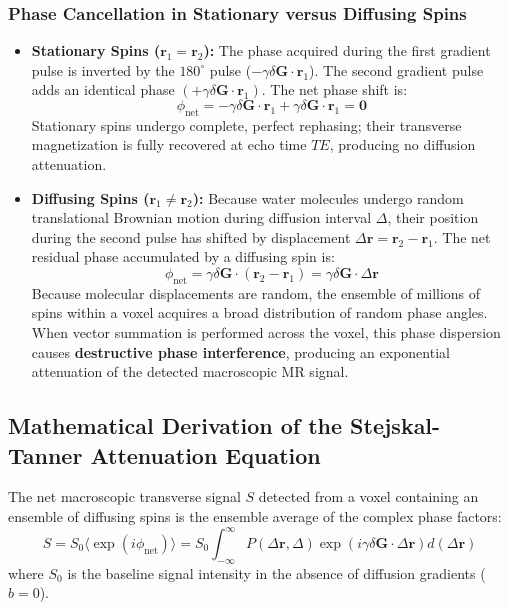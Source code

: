 \documentclass[11pt,a4paper]{article}
\begin{document}
\subsubsection{Phase Cancellation in Stationary versus Diffusing Spins}
\begin{itemize}[leftmargin=*]
    \item \textbf{Stationary Spins ($\mathbf{r}_1 = \mathbf{r}_2$):}
    The phase acquired during the first gradient pulse is inverted by the $180^\circ$ pulse ($-\gamma \delta \mathbf{G} \cdot \mathbf{r}_1$). The second gradient pulse adds an identical phase $(+\gamma \delta \mathbf{G} \cdot \mathbf{r}_1)$. The net phase shift is:
    \begin{equation}
        \phi_{\text{net}} = -\gamma \delta \mathbf{G} \cdot \mathbf{r}_1 + \gamma \delta \mathbf{G} \cdot \mathbf{r}_1 = \mathbf{0}
    \end{equation}
    Stationary spins undergo complete, perfect rephasing; their transverse magnetization is fully recovered at echo time $TE$, producing no diffusion attenuation.
    \item \textbf{Diffusing Spins ($\mathbf{r}_1 \ne \mathbf{r}_2$):}
    Because water molecules undergo random translational Brownian motion during diffusion interval $\Delta$, their position during the second pulse has shifted by displacement $\Delta \mathbf{r} = \mathbf{r}_2 - \mathbf{r}_1$. The net residual phase accumulated by a diffusing spin is:
    \begin{equation}
        \phi_{\text{net}} = \gamma \delta \mathbf{G} \cdot (\mathbf{r}_2 - \mathbf{r}_1) = \gamma \delta \mathbf{G} \cdot \Delta \mathbf{r}
    \end{equation}
    Because molecular displacements are random, the ensemble of millions of spins within a voxel acquires a broad distribution of random phase angles. When vector summation is performed across the voxel, this phase dispersion causes \textbf{destructive phase interference}, producing an exponential attenuation of the detected macroscopic MR signal.
\end{itemize}

\subsection{Mathematical Derivation of the Stejskal-Tanner Attenuation Equation}

The net macroscopic transverse signal $S$ detected from a voxel containing an ensemble of diffusing spins is the ensemble average of the complex phase factors:
\begin{equation}
    S = S_0 \langle \exp(i \phi_{\text{net}}) \rangle = S_0 \int_{-\infty}^{\infty} P(\Delta \mathbf{r}, \Delta) \exp\left( i \gamma \delta \mathbf{G} \cdot \Delta \mathbf{r} \right) d(\Delta \mathbf{r})
\end{equation}
where $S_0$ is the baseline signal intensity in the absence of diffusion gradients ($b = 0$).
\end{document}
